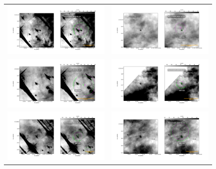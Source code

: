 \documentclass{article}
\begin{document}
\begin{figure}[htp]
\centering
\begin{tabular}{l l}
   \includegraphics[width=0.5\linewidth]{j8oc01010_wcs/158-323-Bally_01-images.pdf}
   &\includegraphics[width=0.5\linewidth]{j8oc01010_wcs/159-221-Bally_01-images.pdf}\\
   \includegraphics[width=0.5\linewidth]{j8oc01010_wcs/161-324-Bally_01-images.pdf}
   &\includegraphics[width=0.5\linewidth]{j8oc01010_wcs/163-222-Bally_01-images.pdf}\\
   \includegraphics[width=0.5\linewidth]{j8oc01010_wcs/163-317-Bally_01-images.pdf}
   &\includegraphics[width=0.5\linewidth]{j8oc01010_wcs/165-235-Bally_01-images.pdf}\\
 \end{tabular}
\end{figure}
\end{document}
